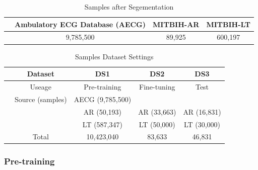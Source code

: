 \documentclass[journal]{IEEEtran}
\begin{document}
\begin{table}[!htbp]
\begin{center}
\begin{threeparttable}
\caption{Samples after Segementation}

\label{Table 2}
\begin{tabular}{cccc}
\hline
& Ambulatory ECG Database (AECG) & MITBIH-AR &  MITBIH-LT\\
\hline
& 9,785,500 & 89,925 &  600,197 \\
\hline
\end{tabular}

\end{threeparttable}

\end{center}
     \end{table}
     
     \begin{table}[!htbp]
\begin{center}
\begin{threeparttable}
\caption{Samples Dataset Settings}
\label{Table 3}
\begin{tabular}{ccccc}
\hline
& Dataset & DS1& DS2 &  DS3\\
\hline
& Useage & Pre-training & Fine-tuning & Test \\
\hline
& Source (samples) & AECG (9,785,500)   &  &   \\
&  & AR (50,193) & AR (33,663) & AR (16,831) \\
& & LT (587,347)& LT (50,000) & LT (30,000) \\
\hline
&Total & 10,423,040 & 83,633 & 46,831 \\
\hline
\end{tabular}
\end{threeparttable}
\end{center}
\end{table}

\subsubsection{Pre-training}
\end{document}
